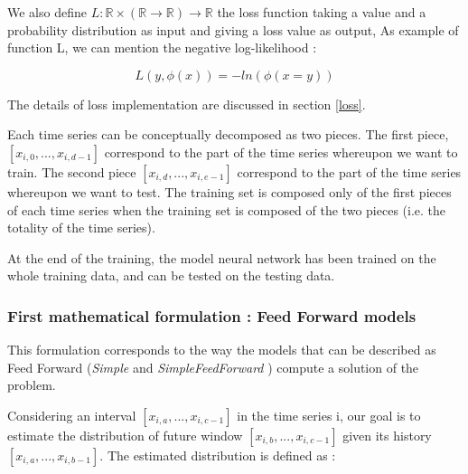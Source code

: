 We also define $L : \mathbb{R} \times (\mathbb{R} \to \mathbb{R} ) \to \mathbb{R} $ the loss function taking a value and a probability distribution as input and giving a loss value as output,
As example of function L, we can mention the negative log-likelihood :

\begin{equation}
    L(y, \phi(x) ) = - ln(\phi(x = y) )
\end{equation}

The details of loss implementation are discussed in section \ref{loss}.


Each time series can be conceptually decomposed as two pieces. The first piece, $[x_{i,0},...,x_{i,d-1}]$  correspond to the part of the time series whereupon we want to train. The second piece $[x_{i,d},...,x_{i,e-1}]$ correspond to the part of the time series whereupon we want to test.
The training set is composed only of the first pieces of each time series when the training set is composed of the two pieces (i.e. the totality of the time series).

At the end of the training, the model neural network has been trained on the whole training data, and can be tested on the testing data. 





\subsubsection{First mathematical formulation : Feed Forward models}

This formulation corresponds to the way the models that can be described as Feed Forward (\textit{Simple} and \textit{SimpleFeedForward }) compute a solution of the problem.



Considering an interval $[x_{i,a},...,x_{i,c-1}]$ in the time series i,
our goal is to estimate the distribution of future window $[x_{i,b},...,x_{i,c-1}]$ given its history $[x_{i,a},...,x_{i,b-1}]$. The estimated distribution is defined as :

